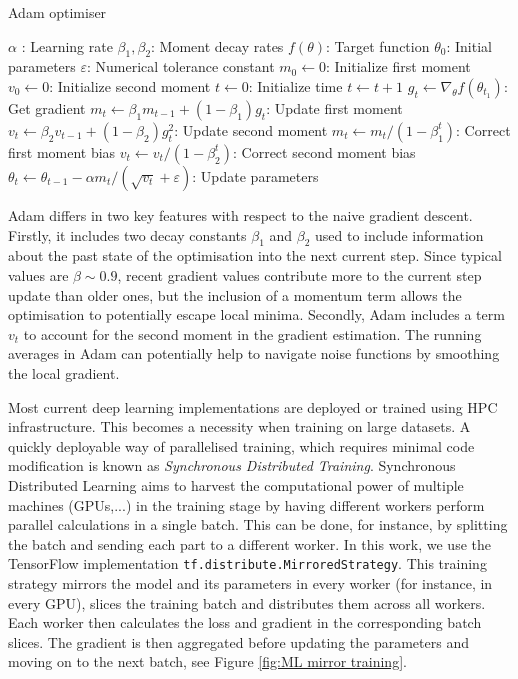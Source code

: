 \begin{algorithm}
    \caption{Adam optimiser}\label{alg:adam}
    \begin{algorithmic}
            \Require $\alpha$ : Learning rate
            \Require $\beta_1, \beta_2$: Moment decay rates
            \Require $f(\theta)$: Target function
            \Require $\theta_0$: Initial parameters
            \Require $\varepsilon$: Numerical tolerance constant
            \State $m_0 \gets 0$: Initialize first moment
            \State $v_0 \gets 0$: Initialize second moment
            \State $t \gets 0$: Initialize time
                \State $t \gets t+1$
                \State $g_t \gets \nabla_\theta f(\theta_{t_1})$: Get gradient
                \State $m_t \gets \beta_1 m_{t-1}+(1-\beta_1)g_t$: Update first moment
                \State $v_t \gets \beta_2 v_{t-1}+(1-\beta_2)g_t^2$: Update second moment
                \State $m_t \gets m_t/(1-\beta_1^t)$: Correct first moment bias
                \State $v_t \gets v_t/(1-\beta_2^t)$: Correct second moment bias
                \State $\theta_t \gets \theta_{t-1}-\alpha m_t/(\sqrt{v_t}+\varepsilon)$: Update parameters
            \EndWhile


    \end{algorithmic}
\end{algorithm}
Adam differs in two key features with respect to the naive gradient descent. Firstly, it includes two decay constants $\beta_1$ and $\beta_2$ used to include information about the past state of the optimisation into the next current step. Since typical values are $\beta \sim 0.9$, recent gradient values contribute more to the current step update than older ones, but the inclusion of a momentum term allows the optimisation to potentially escape local minima. Secondly, Adam includes a term $v_t$ to account for the second moment in the gradient estimation. The running averages in Adam can potentially help to navigate noise functions by smoothing the local gradient.


Most current deep learning implementations are deployed or trained using HPC infrastructure. This becomes a necessity when training on large datasets. A quickly deployable way of parallelised training, which requires minimal code modification is known as \emph{Synchronous Distributed Training}. Synchronous Distributed Learning aims to harvest the computational power of multiple machines (GPUs,...) in the training stage by having different workers perform parallel calculations in a single batch. This can be done, for instance, by splitting the batch and sending each part to a different worker. In this work, we use the TensorFlow implementation \texttt{tf.distribute.MirroredStrategy}. This training strategy mirrors the model and its parameters in every worker (for instance, in every GPU), slices the training batch and distributes them across all workers. Each worker then calculates the loss and gradient in the corresponding batch slices. The gradient is then aggregated before updating the parameters and moving on to the next batch, see Figure \ref{fig:ML mirror training}.

